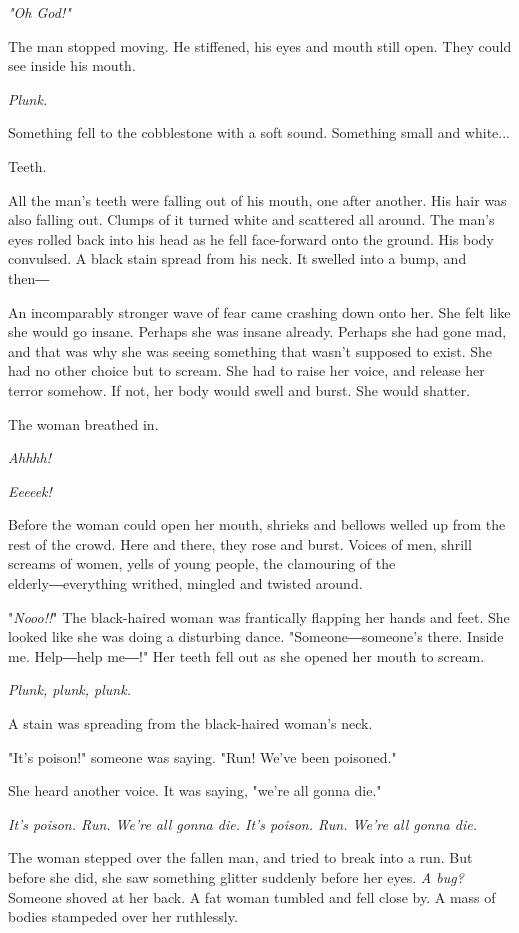 \emph{"Oh God!"}

The man stopped moving. He stiffened, his eyes and mouth still open.
They could see inside his mouth.

\emph{Plunk.}

Something fell to the cobblestone with a soft sound. Something small and
white...

Teeth.

All the man's teeth were falling out of his mouth, one after another.
His hair was also falling out. Clumps of it turned white and scattered
all around. The man's eyes rolled back into his head as he fell
face-forward onto the ground. His body convulsed. A black stain spread
from his neck. It swelled into a bump, and then―

An incomparably stronger wave of fear came crashing down onto her. She
felt like she would go insane. Perhaps she was insane already. Perhaps
she had gone mad, and that was why she was seeing something that wasn't
supposed to exist. She had no other choice but to scream. She had to
raise her voice, and release her terror somehow. If not, her body would
swell and burst. She would shatter.

The woman breathed in.

\emph{Ahhhh!}

\emph{Eeeeek!}

Before the woman could open her mouth, shrieks and bellows welled up
from the rest of the crowd. Here and there, they rose and burst. Voices
of men, shrill screams of women, yells of young people, the clamouring
of the elderly―everything writhed, mingled and twisted around.

"\emph{Nooo!!}" The black-haired woman was frantically flapping her hands and
feet. She looked like she was doing a disturbing dance.
"Someone―someone's there. Inside me. Help―help me―!" Her teeth fell out
as she opened her mouth to scream.

\emph{Plunk, plunk, plunk.}

A stain was spreading from the black-haired woman's neck.

"It's poison!" someone was saying. "Run! We've been poisoned."

She heard another voice. It was saying, "we're all gonna die."

\emph{It's poison. Run. We're all gonna die. It's poison. Run. We're all gonna
die.}

The woman stepped over the fallen man, and tried to break into a run.
But before she did, she saw something glitter suddenly before her eyes.
\emph{A bug?} Someone shoved at her back. A fat woman tumbled and fell close
by. A mass of bodies stampeded over her ruthlessly.

